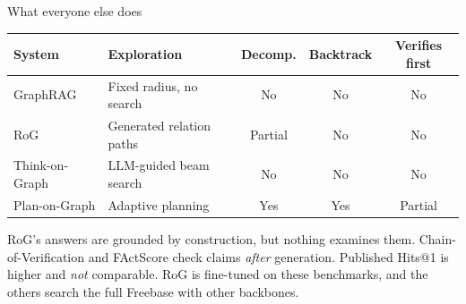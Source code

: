\begin{frame}{What everyone else does}
  \bodyshift{-4pt}
  \begin{table}
    \small
    \setlength{\tabcolsep}{5pt}
    \begin{tabular}{@{}lL{42mm}ccc@{}}
      \toprule
      \textbf{System} & \textbf{Exploration} & \textbf{Decomp.} &
      \textbf{Backtrack} & \textbf{Verifies first} \\
      \midrule
      GraphRAG       & Fixed radius, no search  & No  & No  & No \\
      RoG            & Generated relation paths & Partial & No & No \\
      Think-on-Graph & LLM-guided beam search   & No  & No  & No \\
      Plan-on-Graph  & Adaptive planning        & Yes & Yes & Partial \\
      \bottomrule
    \end{tabular}
  \end{table}
  {\small\agrraggedright RoG's answers are grounded by construction, but
  nothing examines them. Chain-of-Verification and FActScore check claims
  \emph{after} generation. Published Hits@1 is higher and \emph{not}
  comparable. RoG is fine-tuned on these benchmarks, and the others search
  the full Freebase with other backbones.\par}
\end{frame}


